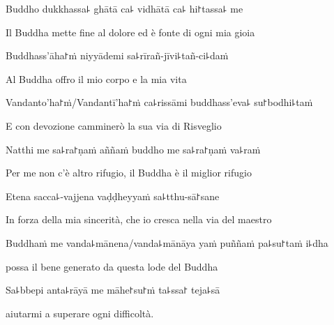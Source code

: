 Buddho dukkhassa꜕ ghātā ca꜕ vidhātā ca꜕ hi꜓tassa꜕ me\\

\begin{english}
Il Buddha mette fine al dolore ed è fonte di ogni mia gioia\\
\end{english}

Buddhass'āha꜓ṁ niyyādemi sa꜕rīrañ-jīvi꜕tañ-ci꜕daṁ\\

\begin{english}
Al Buddha offro il mio corpo e la mia vita\\
\end{english}

Vandanto'ha꜓ṁ/Vandantī'ha꜓ṁ ca꜕rissāmi buddhass'eva꜕ su꜓bodhi꜕taṁ\\

\begin{english}
E con devozione camminerò la sua via di Risveglio\\
\end{english}

Natthi me sa꜕ra꜓ṇaṁ aññaṁ buddho me sa꜕ra꜓ṇaṁ va꜕raṁ\\

\begin{english}
Per me non c'è altro rifugio, il Buddha è il miglior rifugio\\
\end{english}

Etena sacca꜕-vajjena vaḍḍheyyaṁ sa꜕tthu-sā꜓sane\\

\begin{english}
In forza della mia sincerità, che io cresca nella via del maestro\\
\end{english}

Buddhaṁ me vanda꜕mānena/vanda꜕mānāya
yaṁ puññaṁ pa꜕su꜓taṁ i꜕dha\\

\begin{english}
 possa il bene generato da questa lode del Buddha \\
\end{english}

Sa꜕bbepi anta꜕rāyā me māhe꜓su꜓ṁ ta꜕ssa꜓ teja꜕sā

\begin{english}
  aiutarmi a superare ogni difficoltà.
\end{english}

